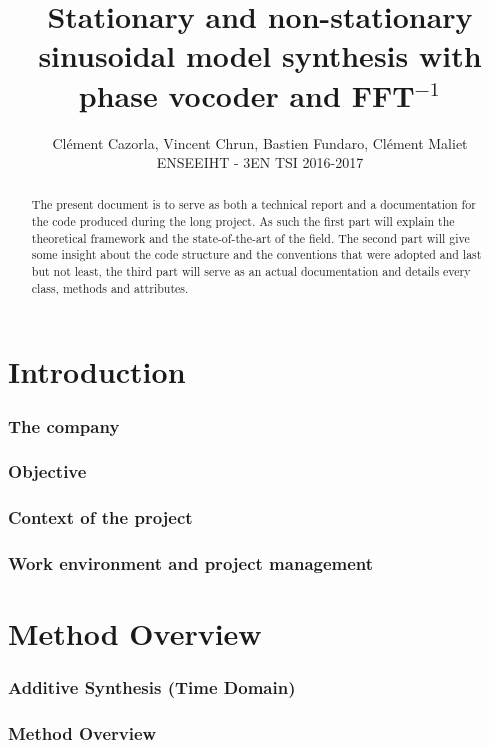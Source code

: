 \documentclass[]{article}
\title{Stationary and non-stationary sinusoidal model synthesis with phase vocoder and FFT$^{-1}$}
\author{Cl\'ement Cazorla, Vincent Chrun, Bastien Fundaro, Cl\'ement Maliet \\ENSEEIHT - 3EN TSI 2016-2017}
\begin{document}
\maketitle

\begin{abstract}
The present document is to serve as both a technical report and a documentation for the code produced during the long project. As such the first part will explain the theoretical framework and the state-of-the-art of the field. The second part will give some insight about the code structure and the conventions that were adopted and last but not least, the third part will serve as an actual documentation and details every class, methods and attributes.
\end{abstract}
\newpage
\tableofcontents


\newpage
\part{Introduction}\label{sec:introduction}

\section{The company}\label{sec:the-company}
\section{Objective}\label{sec:objective}
\section{Context of the project}\label{sec:context-of-the-project}
\section{Work environment and project management}\label{sec:work-environment-and-project-management}

\newpage
\part{Method Overview}\label{part:method-overview}
\section{Additive Synthesis (Time Domain)}\label{sec:additive-synthesis-(time-domain)}
\section{Method Overview}\label{sec:method-overview}
\end{document}
